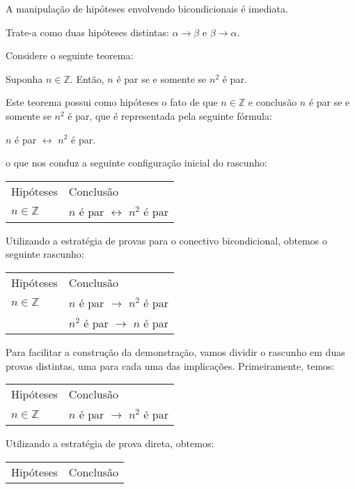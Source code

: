 A manipulação de hipóteses envolvendo bicondicionais é imediata.
\begin{HypothesisStrategy}
Trate-a como duas hipóteses distintas: $\alpha\to\beta$ e
$\beta\to\alpha$.
\end{HypothesisStrategy}

\begin{Example}
Considere o seguinte teorema:
\begin{flushleft}
Suponha $n\in\mathbb{Z}$. Então, $n$ é par se e somente se $n^2$ é par.
\end{flushleft}
Este teorema possui como hipóteses o fato de que $n\in\mathbb{Z}$ e
conclusão $n$ é par se e somente se $n^2$ é par, que é representada
pela seguinte fórmula:
\begin{center}
$n$ é par $\leftrightarrow$ $n^2$ é par.
\end{center}
o que nos conduz a seguinte configuração inicial do rascunho:
\begin{flushleft}
\begin{tabular}{ll}
Hipóteses & Conclusão \\
$n\in\mathbb{Z}$ & $n$ é par $\leftrightarrow$ $n^2$ é par
\end{tabular}
\end{flushleft}
Utilizando a estratégia de provas para o conectivo bicondicional,
obtemos o seguinte rascunho:
\begin{flushleft}
\begin{tabular}{ll}
Hipóteses & Conclusão \\
$n\in\mathbb{Z}$ & $n$ é par $\to$ $n^2$ é par\\
 & $n^2$ é par $\to$ $n$ é par
\end{tabular}
\end{flushleft}
 Para facilitar a construção da demonstração, vamos dividir o rascunho
 em duas provas distintas, uma para cada uma das
 implicações. Primeiramente, temos:
\begin{flushleft}
\begin{tabular}{ll}
Hipóteses & Conclusão \\
$n\in\mathbb{Z}$ & $n$ é par $\to$ $n^2$ é par\\
\end{tabular}
\end{flushleft}
Utilizando a estratégia de prova direta, obtemos:
\begin{flushleft}
\begin{tabular}{ll}
Hipóteses & Conclusão \\

\end{tabular}
\end{flushleft}
\end{Example}
